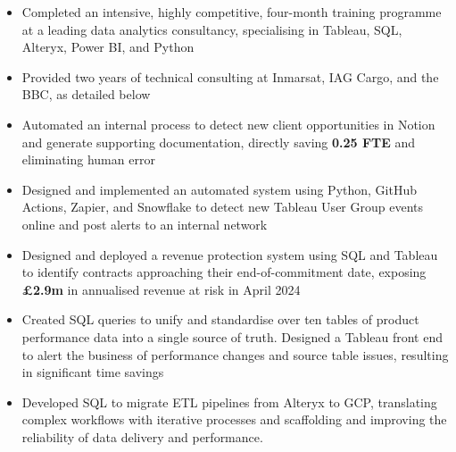 \begin{paracol}{2}

\begin{itemize}
\item Completed an intensive, highly competitive, four-month training programme at a leading data analytics consultancy, specialising in Tableau, SQL, Alteryx, Power BI, and Python
\item Provided two years of technical consulting at Inmarsat, IAG Cargo, and the BBC, as detailed below
\item Automated an internal process to detect new client opportunities in Notion and generate supporting documentation, directly saving \textbf{0.25 FTE} and eliminating human error
\item Designed and implemented an automated system using Python, GitHub Actions, Zapier, and Snowflake to detect new Tableau User Group events online and post alerts to an internal network

\medskip
{}

\end{itemize}

\divider


\begin{itemize}
\item Designed and deployed a revenue protection system using SQL and Tableau to identify contracts approaching their end-of-commitment date, exposing \textbf{£2.9m} in annualised revenue at risk in April 2024
\item Created SQL queries to unify and standardise over ten tables of product performance data into a single source of truth. Designed a Tableau front end to alert the business of performance changes and source table issues, resulting in significant time savings
\item Developed SQL to migrate ETL pipelines from Alteryx to GCP, translating complex workflows with iterative processes and scaffolding and improving the reliability of data delivery and performance.


\end{itemize}
\end{paracol}

